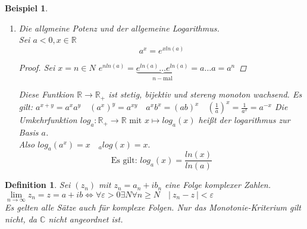 \documentclass[a4paper,titlepage,oneside]{article}
\def\C{\ensuremath{\mathbb{C}} }
\def\R{\ensuremath{\mathbb{R}} }
\def\im{\ensuremath{\mathit{i}} }
\renewcommand{\epsilon}{\ensuremath{\varepsilon} }
\renewcommand{\liminf}[2][n]{\ensuremath{\lim\limits_{#1 \rightarrow \infty}{#2}}}
\newcommand{\abs}[1]{\ensuremath{\left|\:#1\:\right|}}
\theoremstyle{thmstyle}
\newtheorem{defi}[satz]{Definition}
\newtheorem{bsp}[satz]{Beispiel}
\theoremstyle{subthmstyle}
\begin{document}
\begin{bsp}
\begin{enumerate}
\begin{proof}
	Also $\liminf{exp(x)} = \infty$ und $\liminf{exp(x)} = 0$
	Es gibt daher eine stetige Umkehrfunktion $ ln : \R_+ \to  \R \text{ mit } x \mapsto ln(x)$ der natürliche Logarithmus.
	$ln$ ist wieder stetig und streng monoton wachsend.
\end{proof}
\[\text{Es gilt: } ln(x y) = ln(x) + ln(y)\]
	\begin{proof}
	$ ln(x) = \xi$ und $ ln(y) = \eta$\\
	d.h. $ e^{\xi} = x $ und $ e^{\eta} = y$\\
	$\Rightarrow e^{\xi + \eta} = e^{\xi} e^{\eta} = x y \qquad | ln \\
	\Rightarrow ln(e^{\xi + \eta}) = ln(xy) \\
	\Rightarrow \xi + \eta = ln(xy) \\
	\Rightarrow ln(x) + ln(y) = ln(xy)$
	\end{proof}
\item Die allgmeine Potenz und der allgemeine Logarithmus.\\
Sei $ a < 0, x \in \R$ \[a^x = e^{x ln(a)}\]
\begin{proof}
Sei $x = n \in N$
$e^{n ln(a)} = \underbrace{e^{ln(a)} \dots e^{ln(a)}}_{n-\text{mal}} = a\dots a = a ^n$
\end{proof}
Diese Funtkion $\R \to \R_+$ ist stetig, bijektiv und stereng monoton wachsend.
Es gilt: $a^{x+y} = a^x a^y \quad (a^x)^y = a^{xy} \quad a^x b^x = (ab)^x \quad (\frac{1}{a})^x = \frac{1}{a^x} = a^{-x}$
Die Umkehrfunktion $log_a : \R_+ \to \R \text{ mit } x \mapsto log_a(x)$ heißt der logarithmus zur Basis $a$.\\
Also $log_a(a^x) = x \quad _alog(x) = x.$
\[\text{Es gilt: } log_a(x) = \frac{ln(x)}{ln(a)}\]
\end{enumerate}
\end{bsp}

\begin{defi}
Sei $(z_n)$ mit $z_n = a_n + \im b_n$ eine Folge komplexer Zahlen. \\
$\liminf{z_n} = z = a+\im b \Leftrightarrow \forall \epsilon > 0 \exists N  \forall n \ge N \quad \abs{z_n - z} < \epsilon $\\
Es gelten alle Sätze auch für komplexe Folgen. Nur das Monotonie-Kriterium gilt nicht, da \C nicht angeordnet ist.
\end{defi}
\end{document}
